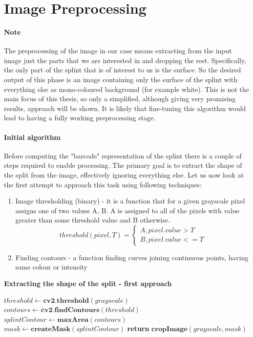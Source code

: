 \section{Image Preprocessing}
\paragraph{Note}
The preprocessing of the image in our case means extracting from the input image just the parts that we are interested in and dropping the rest. Specifically, the only part of the splint that is of interest to us is the surface. So the desired output of this phase is an image containing only the surface of the splint with everything else as mono-coloured background (for example white). This is not the main focus of this thesis, so only a simplified, although giving very promising results, approach will be shown. It is likely that fine-tuning this algorithm would lead to having a fully working preprocessing stage.

\paragraph{Initial algorithm}
Before computing the "barcode" representation of the splint there is a couple of steps required to enable processing. The primary goal is to extract the shape of the split from the image, effectively ignoring everything else. Let us now look at the first attempt to approach this task using following techniques:

\begin{enumerate}
	\item Image thresholding (binary) - it is a function that for a given grayscale pixel assigns one of two values {A, B}. A is assigned to all of the pixels with value greater than some threshold value and B otherwise.
	$$
	threshold (pixel, T) = \begin{cases}
		A, pixel.value > T \\
		B, pixel.value <= T
	\end{cases}
	$$
	\item Finding contours - a function finding curves joining continuous points, having same colour or intensity
\end{enumerate}

\begin{algorithm}{\textbf{Extracting the shape of the split - first approach}}
	\begin{spacing}{1.5}
	\begin{algorithmic}[1]
			\State $threshold \gets \textbf{cv2.threshold}(grayscale)$
			\State $contours \gets \textbf{cv2.findContours}(threshold)$
			\State $splintContour \gets \textbf{maxArea}(contours)$
			\State $mask \gets \textbf{createMask}(splintContour)$
			\State \textbf{return} $\textbf{cropImage}(grayscale, mask)$
		\EndFunction
	\end{algorithmic}
	\end{spacing}
\end{algorithm}

